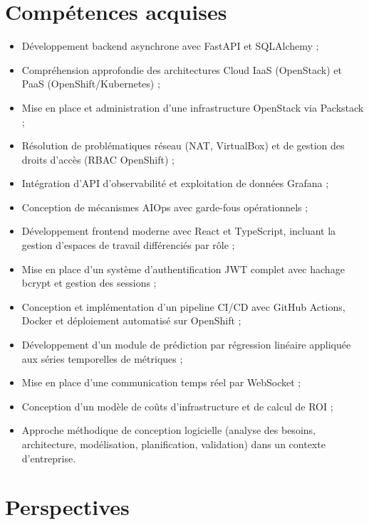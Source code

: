 \documentclass[11pt,a4paper]{report}
\begin{document}
\section*{Compétences acquises}

\begin{itemize}
  \item Développement backend asynchrone avec FastAPI et SQLAlchemy ;
  \item Compréhension approfondie des architectures Cloud IaaS (OpenStack)
    et PaaS (OpenShift/Kubernetes) ;
  \item Mise en place et administration d'une infrastructure OpenStack via
    Packstack ;
  \item Résolution de problématiques réseau (NAT, VirtualBox) et de gestion
    des droits d'accès (RBAC OpenShift) ;
  \item Intégration d'API d'observabilité et exploitation de données Grafana ;
  \item Conception de mécanismes AIOps avec garde-fous opérationnels ;
  \item Développement frontend moderne avec React et TypeScript, incluant la
    gestion d'espaces de travail différenciés par rôle ;
  \item Mise en place d'un système d'authentification JWT complet avec
    hachage bcrypt et gestion des sessions ;
  \item Conception et implémentation d'un pipeline CI/CD avec GitHub Actions,
    Docker et déploiement automatisé sur OpenShift ;
  \item Développement d'un module de prédiction par régression linéaire
    appliquée aux séries temporelles de métriques ;
  \item Mise en place d'une communication temps réel par WebSocket ;
  \item Conception d'un modèle de coûts d'infrastructure et de calcul de ROI ;
  \item Approche méthodique de conception logicielle (analyse des besoins,
    architecture, modélisation, planification, validation) dans un contexte
    d'entreprise.
\end{itemize}

\section*{Perspectives}
\end{document}
